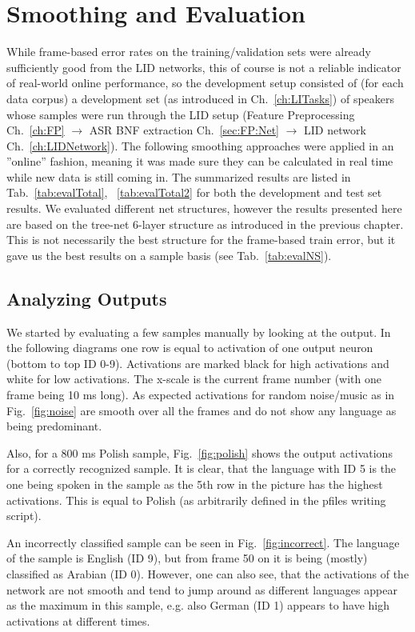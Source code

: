 \chapter{Smoothing and Evaluation}
\label{ch:eval}

While frame-based error rates on the training/validation sets were already sufficiently good from the LID networks, this of course is not a reliable indicator of real-world online performance, so the development setup consisted of (for each data corpus) a development set (as introduced in Ch.~\ref{ch:LITasks}) of speakers whose samples were run through the LID setup (Feature Preprocessing Ch.~\ref{ch:FP} $\rightarrow$ ASR BNF extraction Ch.~\ref{sec:FP:Net} $\rightarrow$ LID network Ch.~\ref{ch:LIDNetwork}). The following smoothing approaches were applied in an ''online'' fashion, meaning it was made sure they can be calculated in real time while new data is still coming in. The summarized results are listed in Tab.~\ref{tab:evalTotal}, ~\ref{tab:evalTotal2} for both the development and test set results. We evaluated different net structures, however the results presented here are based on the tree-net 6-layer structure as introduced in the previous chapter. This is not necessarily the best structure for the frame-based train error, but it gave us the best results on a sample basis (see Tab.~\ref{tab:evalNS}).

\section{Analyzing Outputs}
\label{sec:outputs}

We started by evaluating a few samples manually by looking at the output. In the following diagrams one row is equal to activation of one output neuron (bottom to top ID 0-9). Activations are marked black for high activations and white for low activations. The x-scale is the current frame number (with one frame being 10 ms long). As expected activations for random noise/music as in Fig.~\ref{fig:noise} are smooth over all the frames and do not show any language as being predominant. 

Also, for a 800 ms Polish sample, Fig.~\ref{fig:polish} shows the output activations for a correctly recognized sample. It is clear, that the language with ID 5 is the one being spoken in the sample as the 5th row in the picture has the highest activations. This is equal to Polish (as arbitrarily defined in the pfiles writing script). 

An incorrectly classified sample can be seen in Fig.~\ref{fig:incorrect}. The language of the sample is English (ID 9), but from frame 50 on it is being (mostly) classified as Arabian (ID 0). However, one can also see, that the activations of the network are not smooth and tend to jump around as different languages appear as the maximum in this sample, e.g. also German (ID 1) appears to have high activations at different times. 

